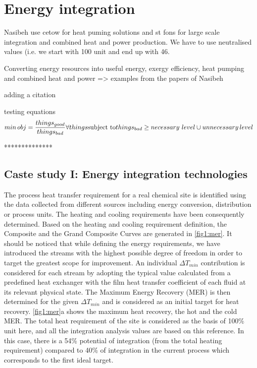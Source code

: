 \section{Energy integration}


Nasibeh use cetow for heat puming solutions and st fons for large scale integration and combined heat and power production. We have to use neutralised values (i.e. we start with 100 unit and end up with 46.


Converting energy resources into useful energy, exergy efficiency, heat pumping and combined heat and power => examples from the papers of Nasibeh

adding a citation \cite{Pouransari_2014}

testing equations
\begin{equation}
min \, obj= \frac{things_{good}}{things_{bad}} \forall things\\
\text{subject to}  \\
things_{bad}\ge necessary\,\, level \cup unnecessary \, level
\end{equation}

**************

\subsection{Caste study I: Energy integration technologies}

The process heat transfer requirement for a real chemical site is identified using the data collected from different sources including energy conversion, distribution or process units. The heating and cooling requirements have been consequently determined. Based on the heating and cooling requirement definition, the Composite and the Grand Composite Curves are generated in \cref{fig1:mer}. It should be noticed that while defining the energy requirements, we have introduced the streams with the highest possible degree of freedom in order to target the greatest scope for improvement. An individual $\Delta T_{min}$ contribution is considered for each stream by adopting the typical value calculated from a predefined heat exchanger with the film heat transfer coefficient of each fluid at its relevant physical state. The Maximum Energy Recovery (MER) is then determined for the given $\Delta T_{min}$ and is considered as an initial target for heat recovery. \cref{fig1:mer}a shows the maximum heat recovery, the hot and the cold MER. The total heat requirement of the site is considered as the basis of 100\% unit here, and all the integration analysis values are based on this reference. In this case, there is a 54\% potential of integration (from the total heating requirement) compared to 40\% of integration in the current process which corresponds to the first ideal target.


